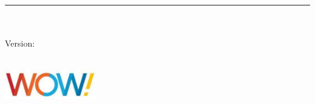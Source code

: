 %
\begin{titlepage}
	\flushright
	\hfill
	\vfill
	{\LARGE\specTitle\par}
	\rule[5pt]{\textwidth}{.4pt} \par
	\Large\firstAuthorName\\\secondAuthorName{}
	\vfill
	\textit{\large\reqDate}\\
	Version: \reqSpecVersion{}
\end{titlepage}


\begin{titlepage}
	\tgherosfont{}
	\centering

	{\Large \clientCompany} \\[4mm]
	\includegraphics[width=4cm]{gfx/wide_open_west_logo_white_bg} \\[2mm]
	\textsf{\clientCompanyGroup} \\
	\textsf{\clientCompanyDepartment} \\

	\vfill
	{\large \reqSubject} \\[5mm]
	{\LARGE \color{ctcolortitle}\textbf{\specTitle} \\[10mm]}
	{\specAuthorsFullTitles} \\


\end{titlepage}
